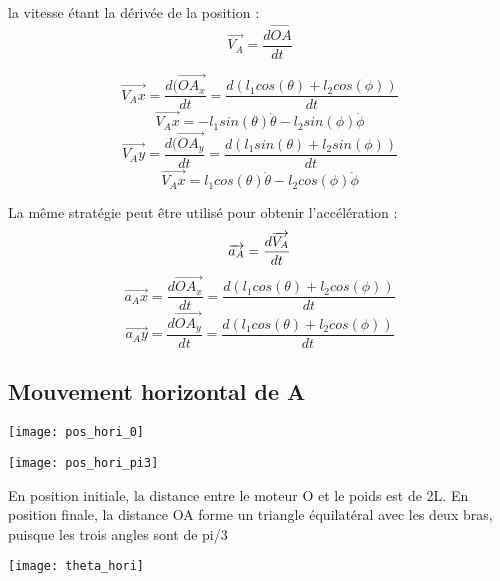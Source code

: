 \documentclass{udes_rapport} %
\begin{document}
la vitesse étant la dérivée de la position :
\begin{equation}
\overrightarrow{V_A} = \frac{d\overrightarrow{OA}}{dt}
\end{equation}

\[ \overrightarrow{V_Ax} = \frac{d(\overrightarrow{OA_x}}{dt} = \frac{d(l_1 cos(\theta) + l_2 cos(\phi))}{dt}	\]
\[ \overrightarrow{V_Ax} = -l_1 sin(\theta) \dot{\theta} -l_2 sin(\phi) \dot{\phi}								\]
\[ \overrightarrow{V_Ay} = \frac{d(\overrightarrow{OA_y}}{dt} = \frac{d(l_1 sin(\theta) + l_2 sin(\phi))}{dt}	\]
\[ \overrightarrow{V_Ax} = l_1 cos(\theta) \dot{\theta} -l_2 cos(\phi) \dot{\phi}								\]


La même stratégie peut être utilisé pour obtenir l'accélération :
\begin{equation}
\overrightarrow{a_A} = \frac{d\overrightarrow{V_A}}{dt}	\\
\end{equation}
\[	\overrightarrow{a_Ax} = \frac{d\overrightarrow{OA_x}}{dt} = \frac{ d(l_1 cos(\theta) + l_2 cos(\phi))}{dt}		\]
\[	\overrightarrow{a_Ay} = \frac{d\overrightarrow{OA_y}}{dt} = \frac{d(l_1 cos(\theta) + l_2 cos(\phi))}{dt}		\]

\subsection{Mouvement horizontal de A}

\noindent\begin{minipage}{\textwidth} 
\begin{minipage}{0.5\textwidth}
  \centering
  \texttt{[image: pos\_hori\_0]}
  \label{pos_hori:position_horizontal_initiale}
\end{minipage}%
\begin{minipage}{0.5\textwidth}
  \centering 
  \texttt{[image: pos\_hori\_pi3]} 
  \label{pos_hori:position_horizontal_finale} 
\end{minipage} 
\label{pos_hori} 
\end{minipage}

En position initiale, la distance entre le moteur O et le poids est de 2L. 
En position finale, la distance OA forme un triangle équilatéral avec les deux bras, puisque les trois
angles sont de pi/3

\begin{center}
	\centering
	\texttt{[image: theta\_hori]}
	\label{composantes_horizontale_theta}
\end{center}
\end{document}
